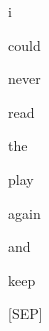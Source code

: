 \documentclass[varwidth=150mm]{standalone}
\begin{document}
\begin{CJK*}{UTF8}{gbsn}
{{{\colorbox{red!1.7793371677398682}{\strut i} \colorbox{red!0.0}{\strut could} \colorbox{red!0.0}{\strut never} \colorbox{red!1.9124702215194702}{\strut read} \colorbox{red!20.894350051879883}{\strut the} \colorbox{red!49.627952575683594}{\strut play} \colorbox{red!0.0}{\strut again} \colorbox{red!0.0}{\strut and} \colorbox{red!1.218800663948059}{\strut keep} \colorbox{red!14.868743896484375}{\strut [SEP]}
}}}
\end{CJK*}
\end{document}
